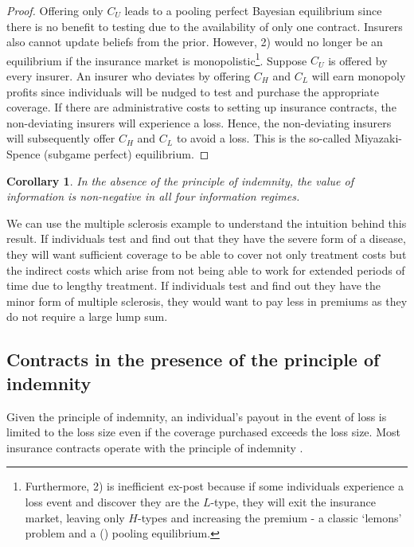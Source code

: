 \documentclass[nonatbib,preprint,12pt]{elsarticle}
\theoremstyle{plain}
\newtheorem{corollary}[theorem]{Corollary}
\theoremstyle{definition}
\theoremstyle{plain}
\theoremstyle{TheoremNum}
\theoremstyle{CorollaryNum}
\theoremstyle{PropositionNum}
\theoremstyle{TheoremNum}
\begin{document}
\begin{proof}
Offering only $C_U$ leads to a pooling perfect Bayesian equilibrium since there is no benefit to testing due to the availability of only one contract. Insurers also cannot update beliefs from the prior. However, 2) would no longer be an equilibrium if the insurance market is monopolistic\footnote{Furthermore, 2) is inefficient ex-post because if some individuals experience a loss event and discover they are the $L$-type, they will exit the insurance market, leaving only $H$-types and increasing the premium - a classic `lemons' problem and a \citeauthor{rothschild1978equilibrium} (\citeyear{rothschild1978equilibrium}) pooling equilibrium.}. Suppose $C_U$ is offered by every insurer. An insurer who deviates by offering $C_H$ and $C_L$ will earn monopoly profits since individuals will be nudged to test and purchase the appropriate coverage. If there are administrative costs to setting up insurance contracts, the non-deviating insurers will experience a loss. Hence, the non-deviating insurers will subsequently offer $C_H$ and $C_L$ to avoid a loss. This is the so-called Miyazaki-Spence (subgame perfect) equilibrium.
\end{proof}
\setcounter{theorem}{0}
\renewcommand{\thetheorem}{\arabic{theorem}}
\begin{corollary}\label{corollary:nonnegnp}
In the absence of the principle of indemnity, the value of information is non-negative in all four information regimes.
\end{corollary}

We can use the multiple sclerosis example to understand the intuition behind this result. If individuals test and find out that they have the severe form of a disease, they will want sufficient coverage to be able to cover not only treatment costs but the indirect costs which arise from not being able to work for extended periods of time due to lengthy treatment. If individuals test and find out they have the minor form of multiple sclerosis, they would want to pay less in premiums as they do not require a large lump sum.


\subsection{Contracts in the presence of the principle of indemnity}

Given the principle of indemnity, an individual's payout in the event of loss is limited to the loss size even if the coverage purchased exceeds the loss size. Most insurance contracts operate with the principle of indemnity \autocite{rejda2005risk}.
\end{document}
